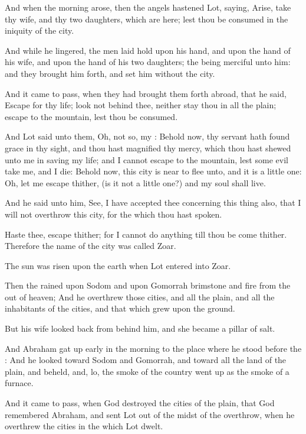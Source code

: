 \verse And when the morning arose, then the angels hastened Lot, saying, Arise, take thy wife, and thy two daughters, which are here; lest thou be consumed in the iniquity of the city.

\verse And while he lingered, the men laid hold upon his hand, and upon the hand of his wife, and upon the hand of his two daughters; the \LORD being merciful unto him: and they brought him forth, and set him without the city.

\verse And it came to pass, when they had brought them forth abroad, that he said, Escape for thy life; look not behind thee, neither stay thou in all the plain; escape to the mountain, lest thou be consumed.

\verse And Lot said unto them, Oh, not so, my \LORD: \verse Behold now, thy servant hath found grace in thy sight, and thou hast magnified thy mercy, which thou hast shewed unto me in saving my life; and I cannot escape to the mountain, lest some evil take me, and I die: \verse Behold now, this city is near to flee unto, and it is a little one: Oh, let me escape thither, (is it not a little one?) and my soul shall live.

\verse And he said unto him, See, I have accepted thee concerning this thing also, that I will not overthrow this city, for the which thou hast spoken.

\verse Haste thee, escape thither; for I cannot do anything till thou be come thither. Therefore the name of the city was called Zoar.

\verse The sun was risen upon the earth when Lot entered into Zoar.

\verse Then the \LORD rained upon Sodom and upon Gomorrah brimstone and fire from the \LORD out of heaven; \verse And he overthrew those cities, and all the plain, and all the inhabitants of the cities, and that which grew upon the ground.

\verse But his wife looked back from behind him, and she became a pillar of salt.

\verse And Abraham gat up early in the morning to the place where he stood before the \LORD: \verse And he looked toward Sodom and Gomorrah, and toward all the land of the plain, and beheld, and, lo, the smoke of the country went up as the smoke of a furnace.

\verse And it came to pass, when God destroyed the cities of the plain, that God remembered Abraham, and sent Lot out of the midst of the overthrow, when he overthrew the cities in the which Lot dwelt.

